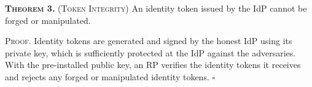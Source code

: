 

\newc
\vspace{2mm}
\noindent\textsc{\textbf{Theorem 3.} (Token Integrity)} { An identity token issued by the IdP cannot be forged or manipulated.}



\vspace{0.85mm}
\noindent \textsc{Proof.} Identity tokens are generated and signed by the honest IdP using its private key, which is sufficiently protected at the IdP against the adversaries.
With the pre-installed public key, an RP verifies the identity tokens it receives and rejects any forged or manipulated identity tokens. \hfill $\square$


